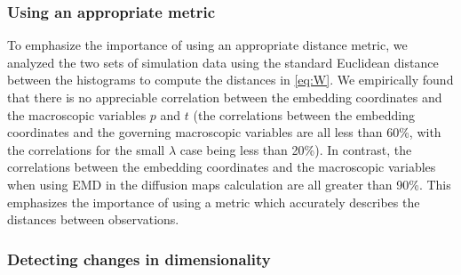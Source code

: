 \documentclass[preprint]{elsarticle}
\begin{document}
%
%
%
%
%




\subsubsection{Using an appropriate metric}

To emphasize the importance of using an appropriate distance metric, we analyzed the two sets of simulation data using the standard Euclidean distance between the histograms to compute the distances in \eqref{eq:W}.
%
We empirically found that there is no appreciable correlation between the embedding coordinates and the macroscopic variables $p$ and $t$ (the correlations between the embedding coordinates and the governing macroscopic variables are all  less than 60\%, with the correlations for the small $\lambda$ case being less than 20\%). 
%
In contrast, the correlations between the embedding coordinates and the macroscopic variables when using EMD in the diffusion maps calculation are all greater than 90\%.
%
This emphasizes the importance of using a metric which accurately describes the distances between observations.

\subsubsection{Detecting changes in dimensionality}
\end{document}
